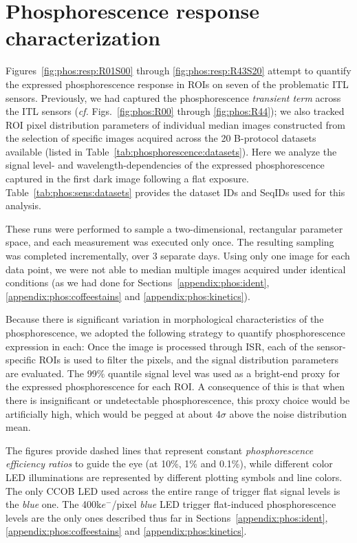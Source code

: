 \section{Phosphorescence response characterization}
\label{appendix:phos:response}

Figures~\ref{fig:phos:resp:R01S00} through \ref{fig:phos:resp:R43S20} attempt to quantify the expressed phosphorescence response in ROIs on seven of the problematic ITL sensors. Previously, we had captured the phosphorescence {\it transient term} across the ITL sensors ({\it cf.} Figs.~\ref{fig:phos:R00} through \ref{fig:phos:R44}); we also tracked ROI pixel distribution parameters of individual median images constructed from the selection of specific images acquired across the 20 B-protocol datasets available (listed in Table~\ref{tab:phosphorescence:datasets}). Here we analyze the signal level- and wavelength-dependencies of the expressed phosphorescence captured in the first dark image following a flat exposure. Table~\ref{tab:phos:sens:datasets} provides the dataset IDs and SeqIDs used for this analysis. 



These runs were performed to sample a two-dimensional, rectangular parameter space, and each measurement was executed only once. The resulting sampling was completed incrementally, over 3 separate days. Using only one image for each data point, we were not able to median multiple images acquired under identical conditions (as we had done for Sections~\ref{appendix:phos:ident}, \ref{appendix:phos:coffeestains} and \ref{appendix:phos:kinetics}). 

Because there is significant variation in morphological characteristics of the phosphorescence, we adopted the following strategy to quantify phosphorescence expression in each: Once the image is processed through ISR, each of the sensor-specific ROIs is used to filter the pixels, and the signal distribution parameters are evaluated. The 99\% quantile signal level was used as a bright-end proxy for the expressed phosphorescence for each ROI. A consequence of this is that when there is insignificant or undetectable phosphorescence, this proxy choice would be artificially high, which would be pegged at about 4$\sigma$ above the noise distribution mean. 

The figures provide dashed lines that represent constant {\it phosphorescence efficiency ratios} to guide the eye (at 10\%, 1\% and 0.1\%), while different color LED illuminations are represented by different plotting symbols and line colors. The only CCOB LED used across the entire range of trigger flat signal levels is the {\it blue} one. The 400k$e^-$/pixel {\it blue} LED trigger flat-induced phosphorescence levels are the only ones described thus far in Sections~\ref{appendix:phos:ident}, \ref{appendix:phos:coffeestains} and \ref{appendix:phos:kinetics}.  

